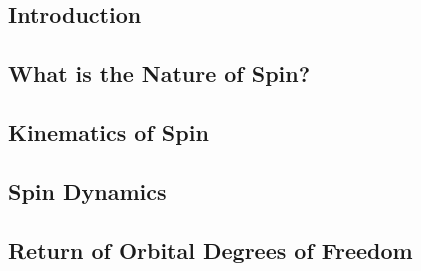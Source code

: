 \subsection{Introduction}

\subsection{What is the Nature of Spin?}

\subsection{Kinematics of Spin}

\subsection{Spin Dynamics}

\subsection{Return of Orbital Degrees of Freedom}
